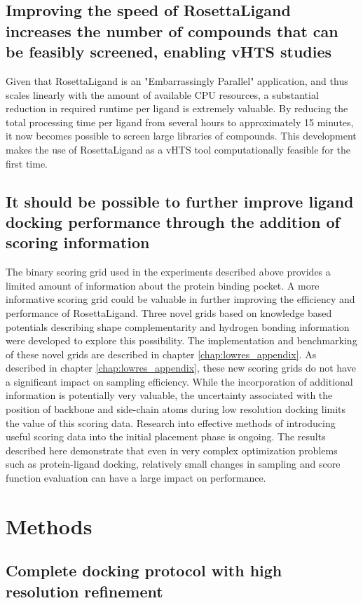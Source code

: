 \subsection{Improving the speed of RosettaLigand increases the number of compounds that can be feasibly screened, enabling \acs{vHTS} studies}
Given that RosettaLigand is an "Embarrassingly Parallel" application, and thus scales linearly with the amount of available \ac{CPU} resources, a substantial reduction in required runtime per ligand is extremely valuable.
By reducing the total processing time per ligand from several hours to approximately 15 minutes, it now becomes possible to screen large libraries of compounds.
This development makes the use of RosettaLigand as a \ac{vHTS} tool computationally feasible for the first time.

\subsection{It should be possible to further improve ligand docking performance through the addition of scoring information}
The binary scoring grid used in the experiments described above provides a limited amount of information about the protein binding pocket.
A more informative scoring grid could be valuable in further improving the efficiency and performance of RosettaLigand.
Three novel grids based on knowledge based potentials describing shape complementarity and hydrogen bonding information were developed to explore this possibility.
The implementation and benchmarking of these novel grids are described in chapter \ref{chap:lowres_appendix}.  
As described in chapter \ref{chap:lowres_appendix}, these new scoring grids do not have a significant impact on sampling efficiency.
While the incorporation of additional information is potentially very valuable, the uncertainty associated with the position of backbone and side-chain atoms during low resolution docking limits the value of this scoring data.
Research into effective methods of introducing useful scoring data into the initial placement phase is ongoing.
The results described here demonstrate that even in very complex optimization problems such as protein-ligand docking, relatively small changes in sampling and score function evaluation can have a  large impact on performance. 

\section{Methods}
\subsection{Complete docking protocol with high resolution refinement}
